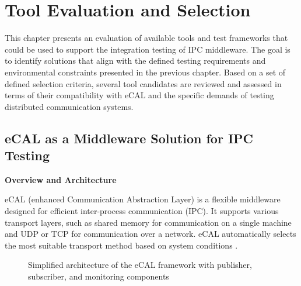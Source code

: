 \clearpage
\section{Tool Evaluation and Selection}

This chapter presents an evaluation of available tools and test frameworks that could be used to support the integration testing of IPC middleware. The goal is to identify solutions that align with the defined testing requirements and environmental constraints presented in the previous chapter. Based on a set of defined selection criteria, several tool candidates are reviewed and assessed in terms of their compatibility with eCAL and the specific demands of testing distributed communication systems.

\subsection{eCAL as a Middleware Solution for IPC Testing}

\textbf{Overview and Architecture}

\vspace{0.4em}
eCAL (enhanced Communication Abstraction Layer) is a flexible middleware designed for efficient inter-process communication (IPC). It supports various transport layers, such as shared memory for communication on a single machine and UDP or TCP for communication over a network. eCAL automatically selects the most suitable transport method based on system conditions \cite{ecal_official_docs}.


\vspace{1em}
\begin{figure}[H]
	\centering
	\caption{Simplified architecture of the eCAL framework with publisher, subscriber, and monitoring components}
	\label{fig:ecal_architecture}
\end{figure}

